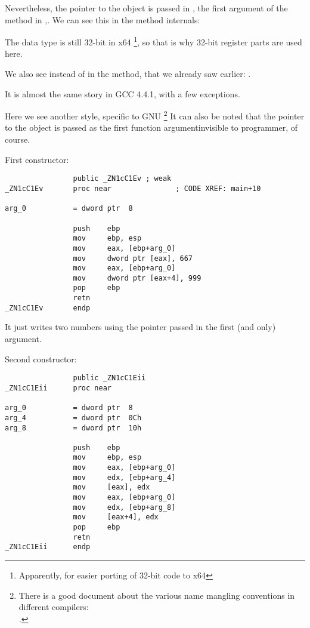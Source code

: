 Nevertheless, the \ITthis pointer to the object is passed in \RCX, the first argument of the method in \RDX,\etc{}.
We can see this in the 
 method internals:



The \Tint data type is still 32-bit in x64
\footnote{Apparently, for easier porting of 32-bit \CCpp code to x64}, 
so that is why 32-bit register parts are used here.

We also see  instead of \RET in the  method, that  we already saw
earlier: .


It is almost the same story in GCC 4.4.1, with a few exceptions.



Here we see another  style, specific to GNU
\footnote{There is a good document about the various name mangling conventions in different compilers:\\
\InSqBrackets{\AgnerFogCC}.}
It can also be noted that the pointer to the object is passed as the first function 
argument\EMDASH{}invisible to programmer, of course.

First constructor:

\begin{lstlisting}
                public _ZN1cC1Ev ; weak
_ZN1cC1Ev       proc near               ; CODE XREF: main+10

arg_0           = dword ptr  8

                push    ebp
                mov     ebp, esp
                mov     eax, [ebp+arg_0]
                mov     dword ptr [eax], 667
                mov     eax, [ebp+arg_0]
                mov     dword ptr [eax+4], 999
                pop     ebp
                retn
_ZN1cC1Ev       endp
\end{lstlisting}

It just writes two numbers using the pointer passed in the first (and only) argument.

Second constructor:

\begin{lstlisting}
                public _ZN1cC1Eii
_ZN1cC1Eii      proc near

arg_0           = dword ptr  8
arg_4           = dword ptr  0Ch
arg_8           = dword ptr  10h

                push    ebp
                mov     ebp, esp
                mov     eax, [ebp+arg_0]
                mov     edx, [ebp+arg_4]
                mov     [eax], edx
                mov     eax, [ebp+arg_0]
                mov     edx, [ebp+arg_8]
                mov     [eax+4], edx
                pop     ebp
                retn
_ZN1cC1Eii      endp
\end{lstlisting}

